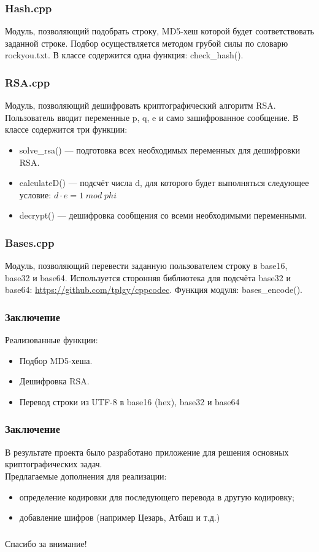 \documentclass[hyperref={unicode}]{beamer}
\begin{document}
\begin{frame}
    \frametitle{Hash.cpp}
    Модуль, позволяющий подобрать строку, MD5-хеш которой будет соответствовать заданной строке. Подбор осуществляется методом грубой силы по словарю rockyou.txt. В классе содержится одна функция: check\_hash().
\end{frame}

\begin{frame}
    \frametitle{RSA.cpp}
    Модуль, позволяющий дешифровать криптографический алгоритм RSA. Пользователь вводит переменные p, q, e и само зашифрованное сообщение. В классе содержится три функции:
    \begin{itemize}
        \item solve\_rsa() --- подготовка всех необходимых переменных для дешифровки RSA.
        \item calculateD() --- подсчёт числа d, для которого будет выполняться следующее условие: $d \cdot e = 1\; mod \; phi$
        \item decrypt() --- дешифровка сообщения со всеми необходимыми переменными.
    \end{itemize} 
\end{frame}

\begin{frame}
    \frametitle{Bases.cpp}
    Модуль, позволяющий перевести заданную пользователем строку в base16, base32 и base64. Используется сторонняя библиотека для подсчёта base32 и base64: \url{https://github.com/tplgy/cppcodec}. Функция модуля: bases\_encode().
\end{frame}

\begin{frame}
  \frametitle{Заключение}
  
  Реализованные функции:
  
  \begin{itemize}
    \item Подбор MD5-хеша.
    \item Дешифровка RSA.
    \item Перевод строки из UTF-8 в base16 (hex), base32 и base64
  \end{itemize}
  
\end{frame}

\begin{frame}
    \frametitle{Заключение}
    
    В результате проекта было разработано приложение для решения основных криптографических задач.\\

    Предлагаемые дополнения для реализации: 
    \begin{itemize}
        \item определение кодировки для последующего перевода в другую кодировку;
        \item добавление шифров (например Цезарь, Атбаш и т.д.)
    \end{itemize}
    
\end{frame}
  
\begin{frame}
  \frametitle{}
  
{\Large\mbox{}\hfil Спасибо за внимание!}
  
\end{frame}
\end{document}
